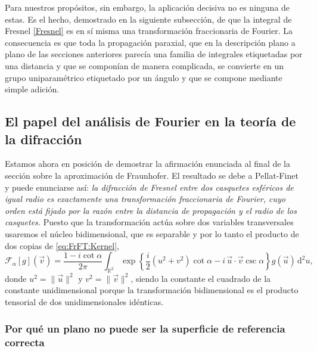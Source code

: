 			Para nuestros propósitos, sin embargo, la aplicación decisiva no es ninguna de estas. Es el hecho, demostrado en la siguiente subsección, de que la integral de Fresnel \eqref{Fresnel} es en sí misma una transformación fraccionaria de Fourier. La consecuencia es que toda la propagación paraxial, que en la descripción plano a plano de las secciones anteriores parecía una familia de integrales etiquetadas por una distancia y que se componían de manera complicada, se convierte en un grupo uniparamétrico etiquetado por un ángulo y que se compone mediante simple adición.

	\subsection{El papel del análisis de Fourier en la teoría de la difracción}

		Estamos ahora en posición de demostrar la afirmación enunciada al final de la sección sobre la aproximación de Fraunhofer. El resultado se debe a Pellat-Finet \citep{pellatfinet1994fresnel, pellatfinet1994fractional} y puede enunciarse así: \textit{la difracción de Fresnel entre dos casquetes esféricos de igual radio es exactamente una transformación fraccionaria de Fourier, cuyo orden está fijado por la razón entre la distancia de propagación y el radio de los casquetes.} Puesto que la transformación actúa sobre dos variables transversales usaremos el núcleo bidimensional, que es separable y por lo tanto el producto de dos copias de \eqref{eq:FrFT:Kernel},
		\begin{equation}\label{eq:FrFT:Kernel2D}
			\mathcal{F}_{\alpha}[g](\vec{v}) = \frac{1-i\cot\alpha}{2\pi}\int_{\mathbb{R}^{2}}\exp\left\{\frac{i}{2}\left(u^{2}+v^{2}\right)\cot\alpha - i\,\vec{u}\cdot\vec{v}\csc\alpha\right\}g(\vec{u})\,\mathrm{d}^{2}u,
		\end{equation}
		donde $u^{2}=\|\vec{u}\|^{2}$ y $v^{2}=\|\vec{v}\|^{2}$, siendo la constante el cuadrado de la constante unidimensional porque la transformación bidimensional es el producto tensorial de dos unidimensionales idénticas.

		\subsubsection{Por qué un plano no puede ser la superficie de referencia correcta}

